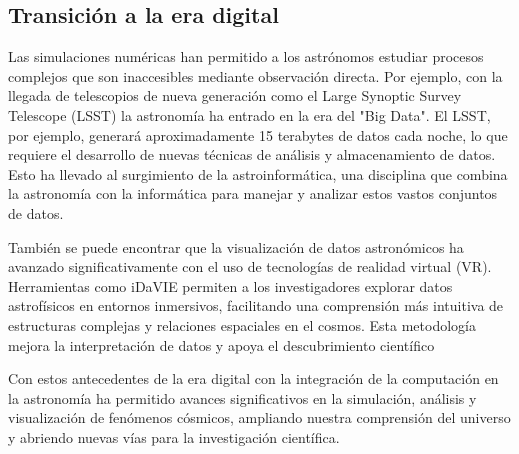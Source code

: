 \subsection{Transición a la era digital}

Las simulaciones numéricas han permitido a los astrónomos estudiar procesos complejos que son inaccesibles mediante observación directa. 
Por ejemplo, con la llegada de telescopios de nueva generación como el Large Synoptic Survey Telescope (LSST) la astronomía ha entrado en la era del "Big Data". El LSST, por ejemplo, generará aproximadamente 15 terabytes de datos cada noche, lo que requiere el desarrollo de nuevas técnicas de análisis y almacenamiento de datos. Esto ha llevado al surgimiento de la astroinformática, una disciplina que combina la astronomía con la informática para manejar y analizar estos vastos conjuntos de datos\cite{huijse2014}.

También se puede encontrar que la visualización de datos astronómicos ha avanzado significativamente con el uso de tecnologías de realidad virtual (VR). Herramientas
como iDaVIE\cite{jarrett2021} permiten a los investigadores explorar datos astrofísicos en entornos inmersivos, facilitando una comprensión más intuitiva de estructuras complejas y relaciones espaciales en el cosmos. Esta metodología mejora la interpretación de datos y apoya el descubrimiento científico

Con estos antecedentes de la era digital con la integración de la computación en la astronomía ha permitido avances significativos en la simulación, análisis y visualización de fenómenos cósmicos, ampliando nuestra comprensión del universo y abriendo nuevas vías para la investigación científica.


